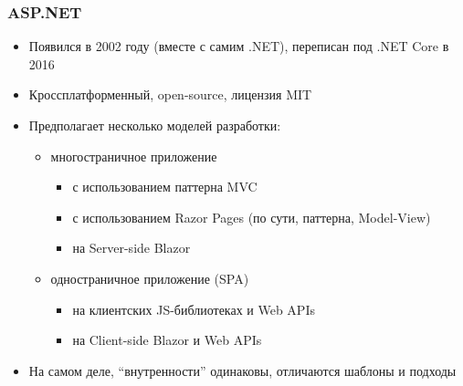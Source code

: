 \documentclass[xetex,mathserif,serif]{beamer}
\begin{document}
    \begin{frame}
        \frametitle{ASP.NET}
        \begin{itemize}
            \item Появился в 2002 году (вместе с самим .NET), переписан под .NET Core в 2016
            \item Кроссплатформенный, open-source, лицензия MIT
            \item Предполагает несколько моделей разработки:
            \begin{itemize}
                \item многостраничное приложение
                \begin{itemize}
                    \item с использованием паттерна MVC
                    \item с использованием Razor Pages (по сути, паттерна, Model-View)
                    \item на Server-side Blazor
                \end{itemize}
                \item одностраничное приложение (SPA)
                \begin{itemize}
                    \item на клиентских JS-библиотеках и Web APIs
                    \item на Client-side Blazor и Web APIs
                \end{itemize}
            \end{itemize}
            \item На самом деле, ``внутренности'' одинаковы, отличаются шаблоны и подходы
        \end{itemize}
    \end{frame}
\end{document}
